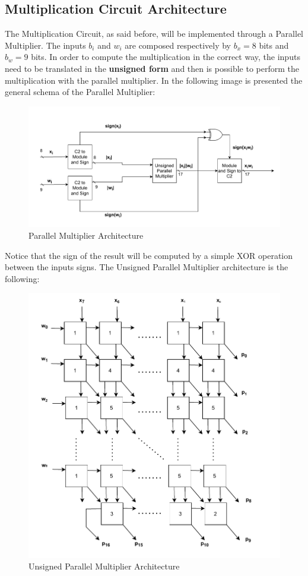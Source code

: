 \subsection{Multiplication Circuit Architecture}
The Multiplication Circuit, as said before, will be implemented through a Parallel Multiplier. The inputs $b_{i}$ and $w_{i}$ are composed respectively by $b_{x} = 8$ bits and $b_{w} = 9$ bits. In order to compute the multiplication in the correct way, the inputs need to be translated in the \textbf{unsigned form} and then is possible to perform the multiplication with the parallel multiplier.
In the following image is presented the general schema of the Parallel Multiplier:
\begin{figure}[H]
	\centering
	\includegraphics[width=\textwidth]{img/architecture_general_parallel_multiplier.pdf}
	\caption{Parallel Multiplier Architecture}
\end{figure}
Notice that the sign of the result will be computed by a simple XOR operation between the inputs signs. 
The Unsigned Parallel Multiplier architecture is the following:
\begin{figure}[H]
	\centering
	\includegraphics[width=13cm]{img/architecture_parallel_multiplier.pdf}
	\caption{Unsigned Parallel Multiplier Architecture}
\end{figure}
